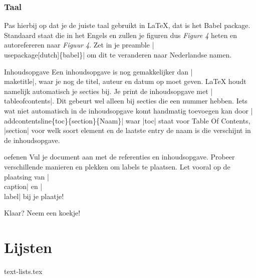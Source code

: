 \documentclass{cursuspresentatie}
\def\importslide#1#2{%
	{#2}
}
\begin{document}
\begin{frame}
	\frametitle{Taal}
	Pas hierbij op dat je de juiste taal gebruikt in \LaTeX, dat is het Babel
	package. Standaard staat die in het Engels en zullen je figuren dus
	\textit{Figure 4} heten en autorefereren naar \textit{Figuur 4}. Zet in je
	preamble \hll|\\usepackage[dutch]\{babel\}| om dit te
	veranderen naar Nederlandse namen.
\end{frame}	

\begin{frame}{Inhoudsopgave}
	Een inhoudsopgave is nog gemakkelijker dan \hll|\\maketitle|, waar je nog de
	titel, auteur en datum op moet geven. \LaTeX{} houdt namelijk automatisch je
	secties bij. Je print de inhoudsopgave met \hll|\\tableofcontents|. Dit
	gebeurt wel alleen bij secties die een nummer hebben. Iets wat niet
	automatisch in de inhoudsopgave komt handmatig toevoegen kan door
    \hll|\\addcontentsline\{toc\}\{section\}\{Naam\}|
    waar \hll|toc| staat voor Table Of Contents, \hll|section| voor welk soort
	element en de laatste entry de naam is die verschijnt in de inhoudsopgave.
\end{frame}

\begin{frame}{oefenen}
	Vul je document aan met de referenties en inhoudsopgave. Probeer
	verschillende manieren en plekken om labels te plaatsen. Let vooral op de
	plaatsing van \hll|\\caption| en \hll|\\label| bij je plaatje!

	Klaar? Neem een koekje!
\end{frame}

\section{Lijsten}

\importslide{text}{text-lists.tex}
\end{document}
